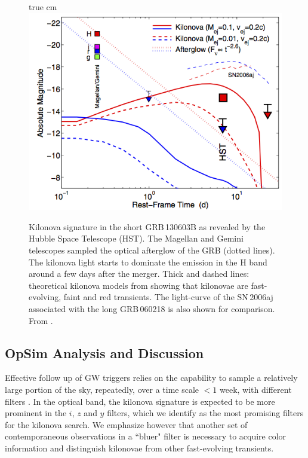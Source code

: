\begin{figure}
 true cm
\centering
\includegraphics[scale=0.85]{figs/transients/kilonovaBerger.png}
\caption{Kilonova signature in the short GRB\,130603B as revealed by the Hubble Space Telescope (HST). The Magellan and Gemini telescopes sampled the optical afterglow of the GRB (dotted lines). The kilonova light starts to dominate the emission in the H band around a few days after the merger. Thick and dashed lines: theoretical kilonova models from \cite{Barnes13} showing that kilonovae are fast-evolving, faint and red transients. The light-curve of the SN\,2006aj associated with the long GRB\,060218  is also shown for comparison. From \cite{Berger13}.}
\label{Fig:kilonova}
\end{figure}






\subsection{OpSim Analysis and Discussion}
\label{sec:\secname:analysis}

Effective follow up of GW triggers relies on the capability to sample a relatively large portion of the sky, repeatedly, over a time scale $<1$ week, with different filters \citep{Cowperthwaite15}. In the optical band, the kilonova signature is expected to be more prominent in the $i$, $z$  and $y$ filters, which we identify as the most promising filters for the kilonova search. We emphasize however that another set of contemporaneous observations in  a ``bluer" filter is necessary to acquire color information and distinguish kilonovae from other fast-evolving transients.

